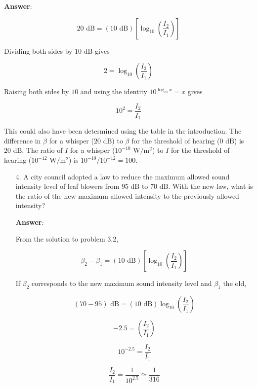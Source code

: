 \documentclass{article}
\begin{document}
\begin{enumerate}
        \textbf{Answer}:

        $$20\text{ dB} = (10 \text{ dB})\left[\log_{10}\left(\frac{I_2}{I_1}\right)\right]$$

        Dividing both sides by $10 \text{ dB}$ gives

        $$2 = \log_{10}\left(\frac{I_2}{I_1}\right)$$

        Raising both sides by $10$ and using the identity $10^{\log_{10}x} = x$ gives

        $$10^2 = \frac{I_2}{I_1}$$

        This could also have been determined using the table in the introduction. The difference in $\beta$ for a whisper ($20\text{ dB}$) to $\beta$ for the threshold of hearing ($0\text{ dB}$) is $20\text{ dB}$. The ratio of $I$ for a whisper ($10^{-10}\text{ W}/\text{m}^2$) to $I$ for the threshold of hearing ($10^{-12}\text{ W}/\text{m}^2$) is $10^{-10}/10^{-12}=100$.

        \ifsolutions

        \else
        \vskip 72pt
        \fi

\end{enumerate}

\vskip 0.75pt

\begin{enumerate}

  \item[4.] A city council adopted a law to reduce the maximum allowed sound intensity level of leaf blowers from $95\text{ dB}$ to $70\text{ dB}$. With the new law, what is the ratio of the new maximum allowed intensity to the previously allowed intensity?

            \ifsolutions
            \textbf{Answer}:

            From the solution to problem 3.2,

            $$\beta_2-\beta_1 = (10 \text{ dB})\left[\log_{10}\left(\frac{I_2}{I_1}\right)\right]$$

            If $\beta_2$ corresponds to the new maximum sound intensity level and $\beta_1$ the old,

            $$(70-95)\text{ dB} =  (10 \text{ dB})\log_{10}\left(\frac{I_2}{I_1}\right)$$

            $$-2.5 = \left(\frac{I_2}{I_1}\right)$$

            $$10^{-2.5} = \frac{I_2}{I_1}$$

            $$\frac{I_2}{I_1} = \frac{1}{10^{2.5}} \simeq \frac{1}{316}$$
            \else
            \vskip 96pt
            \fi

\end{enumerate}
\end{document}
